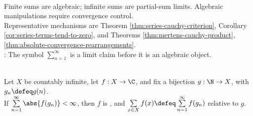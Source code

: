 \begin{perspective} \label{per:formal-series-algebra-needs-convergence} \\
Finite sums are algebraic; infinite sums are partial-sum limits. Algebraic manipulations require convergence control.\\
Representative mechanisms are Theorem \ref{thm:series-cauchy-criterion}, Corollary \ref{cor:series-terms-tend-to-zero}, and Theorems \ref{thm:mertens-cauchy-product}, \ref{thm:absolute-convergence-rearrangements}.\\
: The symbol $\sum\limits_{n=1}^{\infty}$ is a limit claim before it is an algebraic object.
\end{perspective}

\begin{definition} \label{def:absolute-summation-over-countable-set} \\
Let $X$ be countably infinite, let $f:X\to\C$, and fix a bijection $g:\N\to X$, with $g_n\defeq g(n)$.\\
If $\sum\limits_{n=1}^{\infty}\abs{f(g_n)}<\infty$, then $f$ is , and $\sum\limits_{x\in X}f(x)\defeq\sum\limits_{n=1}^{\infty}f(g_n)$ relative to $g$.
\end{definition}

